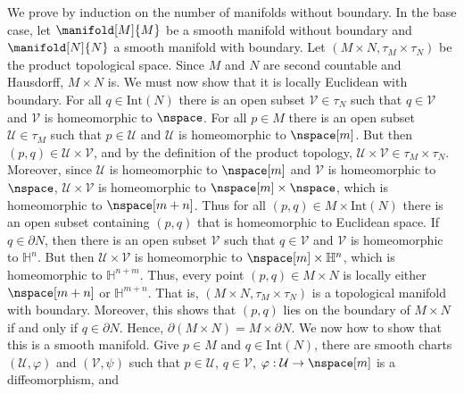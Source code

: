         \begin{solution}
            We prove by induction on the number of manifolds without boundary.
            In the base case, let $\manifold[M]{M}$ be a smooth manifold without
            boundary and $\manifold[N]{N}$ a smooth manifold with boundary.
            Let $(M\times{N},\tau_{M}\times\tau_{N})$ be the product topological
            space. Since $M$ and $N$ are second countable and Hausdorff,
            $M\times{N}$ is. We must now show that it is locally Euclidean with
            boundary. For all $q\in\textrm{Int}(N)$ there is an open subset
            $\mathcal{V}\in\tau_{N}$ such that $q\in\mathcal{V}$ and
            $\mathcal{V}$ is homeomorphic to $\nspace$. For all $p\in{M}$ there
            is an open subset $\mathcal{U}\in\tau_{M}$ such that
            $p\in\mathcal{U}$ and $\mathcal{U}$ is homeomorphic to $\nspace[m]$.
            But then $(p,q)\in\mathcal{U}\times\mathcal{V}$, and by the
            definition of the product topology,
            $\mathcal{U}\times\mathcal{V}\in\tau_{M}\times\tau_{N}$. Moreover,
            since $\mathcal{U}$ is homeomorphic to $\nspace[m]$ and
            $\mathcal{V}$ is homeomorphic to $\nspace$,
            $\mathcal{U}\times\mathcal{V}$ is homeomorphic to
            $\nspace[m]\times\nspace$, which is homeomorphic to $\nspace[m+n]$.
            Thus for all $(p,q)\in{M}\times\textrm{Int}(N)$ there is an open
            subset containing $(p,q)$ that is homeomorphic to Euclidean space.
            If $q\in\partial{N}$, then there is an open subset
            $\mathcal{V}$ such that $q\in\mathcal{V}$ and $\mathcal{V}$ is
            homeomorphic to $\mathbb{H}^{n}$. But then
            $\mathcal{U}\times\mathcal{V}$ is homeomorphic to
            $\nspace[m]\times\mathbb{H}^{n}$, which is homeomorphic to
            $\mathbb{H}^{n+m}$. Thus, every point $(p,q)\in{M}\times{N}$ is
            locally either $\nspace[m+n]$ or $\mathbb{H}^{m+n}$. That is,
            $(M\times{N},\tau_{M}\times\tau_{N})$ is a topological manifold
            with boundary. Moreover, this shows that $(p,q)$ lies on the
            boundary of $M\times{N}$ if and only if $q\in\partial{N}$. Hence,
            $\partial(M\times{N})=M\times\partial{N}$. We now how to show that
            this is a smooth manifold. Give $p\in{M}$ and $q\in\textrm{Int}(N)$,
            there are smooth charts $(\mathcal{U},\varphi)$ and
            $(\mathcal{V},\psi)$ such that $p\in\mathcal{U}$, $q\in\mathcal{V}$,
            $\varphi:\mathcal{U}\rightarrow\nspace[m]$ is a diffeomorphism, and

\end{solution}
